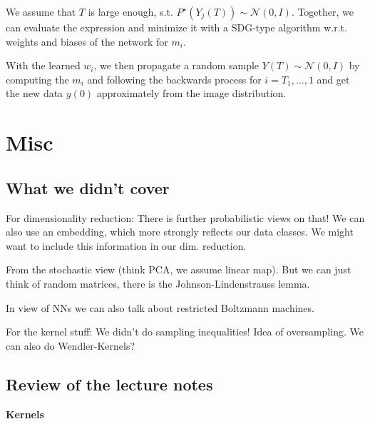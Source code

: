 We assume that $T$ is large enough, s.t. $P^\star(Y_j(T))\sim\mathcal{N}(0,I)$. Together, we can evaluate the expression 
and minimize it with a SDG-type algorithm w.r.t. weights and biases of the network for $m_i$.

With the learned $w_i$, we then propagate a random sample $Y(T)\sim\mathcal{N}(0,I)$ by computing the 
$m_i$ and following the backwards process  for $i=T_1,\dots,1$ and get the new data $y(0)$ approximately
from the image distribution.

\chapter{Misc}

\section{What we didn't cover}

For dimensionality reduction: There is further probabilistic views on that! We can also use an embedding, which more strongly reflects our data classes.
We might want to include this information in our dim. reduction.

From the stochastic view (think PCA, we  assume linear map). But we can just think of random matrices, there is the Johnson-Lindenstrauss lemma.

In view of NNs we can also talk about restricted Boltzmann machines. 

For the kernel stuff: We didn't do sampling inequalities! Idea of oversampling. We can also do Wendler-Kernels?

\section{Review of the lecture notes}

\textbf{Kernels}

